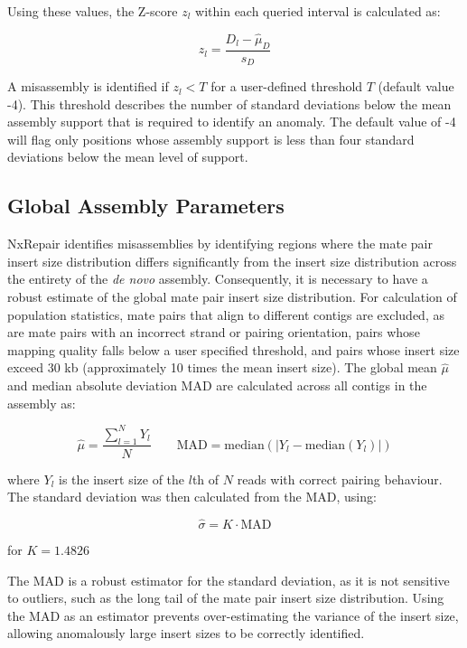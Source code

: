 \documentclass[fleqn,10pt]{wlpeerj}
\begin{document}
Using these values, the Z-score $z_l$ within each queried interval is calculated as: 

\begin{equation}
z_l = \frac{D_l - \hat{\mu}_D}{s_D}
\label{eq:zscore}
\end{equation}

A misassembly is identified if $z_l < T$ for a user-defined threshold $T$ (default value -4). This threshold describes the number of standard deviations below the mean assembly support that is required to identify an anomaly. The default value of -4 will flag only positions whose assembly support is less than four standard deviations below the mean level of support.

\subsection*{Global Assembly Parameters}
NxRepair identifies misassemblies by identifying regions where the mate pair insert size distribution differs significantly from the insert size distribution across the entirety of the \textit{de novo} assembly. Consequently, it is necessary to have a robust estimate of the global mate pair insert size distribution. For calculation of population statistics, mate pairs that align to different contigs are excluded, as are mate pairs with an incorrect strand or pairing orientation, pairs whose mapping quality falls below a user specified threshold, and pairs whose insert size exceed 30 kb (approximately 10 times the mean insert size). The global mean $\hat{\mu}$ and median absolute deviation $\text{MAD}$ are calculated across all contigs in the assembly as:

\begin{equation}
\hat{\mu} = \frac{\sum_{l=1}^N Y_l}{N} \qquad \text{MAD} = \text{median}(|Y_l - \text{median}(Y_l)|)
\label{eq:global}
\end{equation}

where $Y_l$ is the insert size of the $l$th of $N$ reads with correct pairing behaviour. The standard deviation was then calculated from the MAD, using:

\begin{equation}
\hat{\sigma} = K \cdot \text{MAD}
\label{eq:mad_to_sigma}
\end{equation}

for $K = 1.4826$

The $\text{MAD}$ is a robust estimator for the standard deviation, as it is not sensitive to outliers, such as the long tail of the mate pair insert size distribution. Using the MAD as an estimator prevents over-estimating the variance of the insert size, allowing anomalously large insert sizes to be correctly identified.
\end{document}
